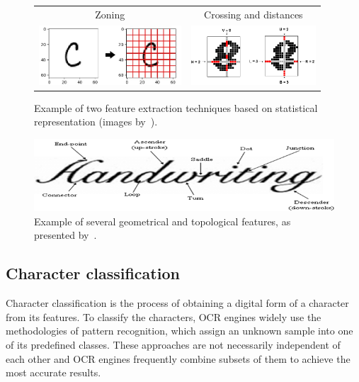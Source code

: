 \begin{figure}[t]
\centering
{\sffamily
\begin{tabular}{cc}
Zoning & Crossing and distances\\
\includegraphics[height=6em]{img/textDetection/feature_zoning.jpg}
&
\includegraphics[height=6em]{img/textDetection/feature_crossing.png}
\end{tabular}
}
\caption{Example of two feature extraction techniques based on statistical representation (images by~\citet{statisticalFeatures}).}
\label{fig:featureExtractionStatistical}
\end{figure}

\begin{figure}[t]
\centering
\includegraphics[width=0.8\linewidth]{img/textDetection/features_geometrical.png}
\caption{Example of several geometrical and topological features, as presented by~\citet{geometricalFeatures}.}
\label{fig:featureExtractionGeometrical}
\end{figure}

\subsection{Character classification}

Character classification is the process of obtaining a digital form of a character from its features. To classify the characters, OCR engines widely use the methodologies of pattern recognition, which assign an unknown sample into one of its predefined classes. These approaches are not necessarily independent of each other and OCR engines frequently combine subsets of them to achieve the most accurate results.

